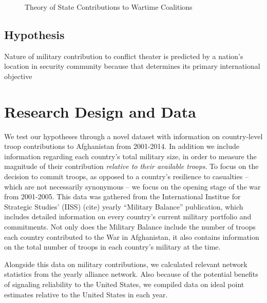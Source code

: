 \documentclass[12pt,letterpaper]{article}
\begin{document}
		\begin{figure}[H]
		\centering
		\caption{Theory of State Contributions to Wartime Coalitions}
		\label{fig:theory}
		\end{figure}

	\subsection{Hypothesis}
		Nature of military contribution to conflict theater is predicted by a nation's location in security community because that determines its primary international objective

\section{Research Design and Data}
	We test our hypotheses through a novel dataset with information on country-level troop contributions to Afghanistan from 2001-2014. In addition we include information regarding each country's total military size, in order to measure the magnitude of their contribution \textit{relative to their available troops}. To focus on the decision to commit troops, as opposed to a country's resilience to casualties -- which are not necessarily synonymous -- we focus on the opening stage of the war from 2001-2005. This data was gathered from the International Institue for Strategic Studies' (IISS) (cite) yearly ``Military Balance'' publication, which includes detailed information on every country's current military portfolio and commitments. Not only does the Military Balance include the number of troops each country contributed to the War in Afghanistan, it also contains information on the total number of troops in each country's military at the time.


	Alongside this data on military contributions, we calculated relevant network statistics from the yearly alliance network. Also because of the potential benefits of signaling reliability to the United States, we compiled data on ideal point estimates relative to the United States in each year.
\end{document}
